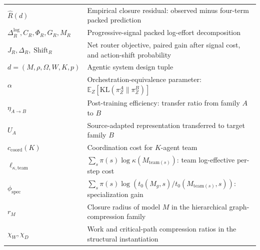 \documentclass[10pt]{article}
\theoremstyle{paperplain}
\theoremstyle{paperdefinition}
\theoremstyle{paperremark}
\newcommand{\KL}{\mathrm{KL}}
\newcommand{\E}{\mathbb{E}}
\begin{document}
\begin{center}
\begin{tabular}{@{}lp{9cm}@{}}
$\widehat R(d)$ & Empirical closure residual: observed minus four-term packed prediction \\
$\Delta_R^{\log},C_R,\Phi_R,G_R,M_R$ & Progressive-signal packed log-effort decomposition \\
$J_R,\Delta_R,\operatorname{Shift}_R$ & Net router objective, paired gain after signal cost, and action-shift probability \\
$d = (M, \rho, \Omega, W, K, p)$ & Agentic system design tuple \\
$\alpha$ & Orchestration-equivalence parameter: $\E_Z[\KL(\pi^A_Z \| \pi^B_Z)]$ \\
$\eta_{A \to B}$ & Post-training efficiency: transfer ratio from family $A$ to $B$ \\
$U_A$ & Source-adapted representation transferred to target family $B$ \\
$c_{\mathrm{coord}}(K)$ & Coordination cost for $K$-agent team \\
$\ell_{\kappa,\mathrm{team}}$ & $\sum_s\pi(s)\log\kappa(M_{\mathrm{team}(s)})$: team log-effective per-step cost \\
$\phi_{\mathrm{spec}}$ & $\sum_s \pi(s)\log(t_0(M_g,s)/t_0(M_{\mathrm{team}(s)},s))$: specialization gain \\
$r_M$ & Closure radius of model $M$ in the hierarchical graph-compression family \\
$\chi_W,\chi_D$ & Work and critical-path compression ratios in the structural instantiation \\
\bottomrule
\end{tabular}
\end{center}
\end{document}

